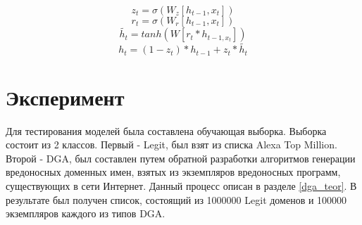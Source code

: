     \begin{equation}\label{gr:1}
    z_{t}=\sigma(W_{z}[h_{t-1},x_{t}])
    \end{equation}
    \begin{equation}\label{gr:2}
    r_{t}=\sigma(W_{r}[h_{t-1},x_{t}])
    \end{equation}
    \begin{equation}\label{gr:3}
    \tilde{h_{t}}=tanh(W[r_{t}*h_{t-1,x_{t}}])
    \end{equation}
    \begin{equation}\label{gr:4}
    h_{t}=(1-z_{t})*h_{t-1}+z_{t}*\tilde{h_{t}}
    \end{equation}
\clearpage

\section{Эксперимент}\label{experiment}
    Для тестирования моделей была составлена обучающая выборка. Выборка состоит из 2 классов. Первый - Legit, был взят из списка Alexa Top Million. Второй - DGA, был составлен путем обратной разработки алгоритмов генерации вредоносных доменных имен, взятых из экземпляров вредоносных программ, существующих в сети Интернет. Данный процесс описан в разделе \ref{dga_teor}. В результате был получен список, состоящий из 1000000 Legit доменов и 100000 экземпляров каждого из типов DGA.
